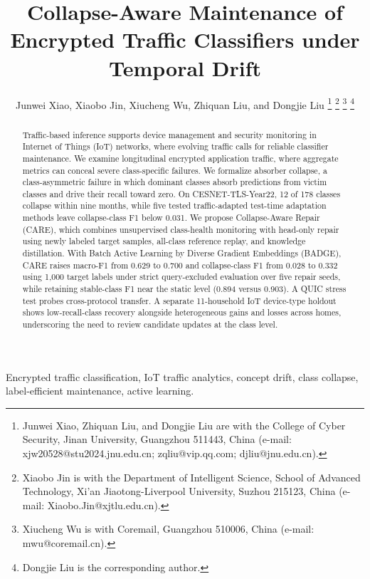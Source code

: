 \documentclass[journal]{IEEEtran}
\begin{document}
\title{Collapse-Aware Maintenance of Encrypted Traffic Classifiers under Temporal Drift}

\author{Junwei Xiao, Xiaobo Jin, Xiucheng Wu, Zhiquan Liu, and Dongjie Liu%
\thanks{Junwei Xiao, Zhiquan Liu, and Dongjie Liu are with the College of Cyber Security, Jinan University, Guangzhou 511443, China (e-mail: xjw20528@stu2024.jnu.edu.cn; zqliu@vip.qq.com; djliu@jnu.edu.cn).}%
\thanks{Xiaobo Jin is with the Department of Intelligent Science, School of Advanced Technology, Xi'an Jiaotong-Liverpool University, Suzhou 215123, China (e-mail: Xiaobo.Jin@xjtlu.edu.cn).}%
\thanks{Xiucheng Wu is with Coremail, Guangzhou 510006, China (e-mail: mwu@coremail.cn).}%
\thanks{Dongjie Liu is the corresponding author.}}

\maketitle

\begin{abstract}
Traffic-based inference supports device management and security monitoring in Internet of Things (IoT) networks, where evolving traffic calls for reliable classifier maintenance. We examine longitudinal encrypted application traffic, where aggregate metrics can conceal severe class-specific failures. We formalize absorber collapse, a class-asymmetric failure in which dominant classes absorb predictions from victim classes and drive their recall toward zero. On CESNET-TLS-Year22, 12 of 178 classes collapse within nine months, while five tested traffic-adapted test-time adaptation methods leave collapse-class F1 below 0.031. We propose Collapse-Aware Repair (CARE), which combines unsupervised class-health monitoring with head-only repair using newly labeled target samples, all-class reference replay, and knowledge distillation. With Batch Active Learning by Diverse Gradient Embeddings (BADGE), CARE raises macro-F1 from 0.629 to 0.700 and collapse-class F1 from 0.028 to 0.332 using 1{,}000 target labels under strict query-excluded evaluation over five repair seeds, while retaining stable-class F1 near the static level (0.894 versus 0.903). A QUIC stress test probes cross-protocol transfer. A separate 11-household IoT device-type holdout shows low-recall-class recovery alongside heterogeneous gains and losses across homes, underscoring the need to review candidate updates at the class level.
\end{abstract}

\begin{IEEEkeywords}
Encrypted traffic classification, IoT traffic analytics, concept drift, class collapse, label-efficient maintenance, active learning.
\end{IEEEkeywords}
\end{document}
